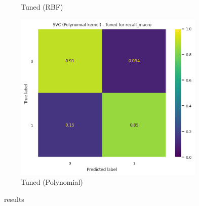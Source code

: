 \begin{frame}{\subsecname}
\begin{figure}
\begin{subfigure}[c]{0.32\textwidth}
        \caption{Tuned (RBF)}
    \end{subfigure}
    \begin{subfigure}[c]{0.32\textwidth}
        \includegraphics[width=\textwidth]{images/models/SVM_tuned_poly.png}
        \caption{Tuned (Polynomial)}
    \end{subfigure}
    \caption{\subsecname\ results}
\end{figure}
\end{frame}

